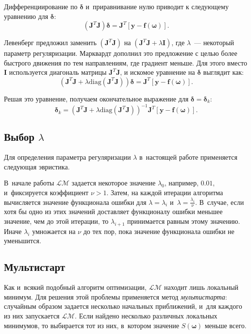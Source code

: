 \documentclass[12pt,a4paper]{amsart}
\begin{document}
Дифференциирование по $\boldsymbol{\delta}$ и~приравнивание нулю приводит к
следующему уравнению для $\boldsymbol{\delta}$:
\[
(\mathbf{J}^T\mathbf{J})\boldsymbol{\delta} = \mathbf{J}^T [\mathbf{y - f(\boldsymbol{\omega})}].
\]

Левенберг предложил заменить $(\mathbf{J}^T\mathbf{J})$ на
$(\mathbf{J}^T\mathbf{J} + \lambda\mathbf{I})$, где $\lambda$~--- некоторый
параметр регуляризации. Марквардт дополнил это предложение с целью более
быстрого движения по тем направлениям, где градиент меньше. Для этого вместо
$\mathbf{I}$ используется диагональ матрицы $\mathbf{J}^T\mathbf{J}$, и
искомое уравнение на $\boldsymbol{\delta}$ выглядит как:
\[
(\mathbf{J}^T\mathbf{J} + \lambda \text{diag} (\mathbf{J}^T\mathbf{J}))\boldsymbol{\delta} = \mathbf{J}^T [\mathbf{y - f(\boldsymbol{\omega})}].
\]

Решая это уравнение, получаем окончательное выражение для
$\boldsymbol{\delta} = \boldsymbol{\delta}_k$:
\[
\boldsymbol{\delta}_k = (\mathbf{J}^T\mathbf{J} + \lambda \text{diag} (\mathbf{J}^T\mathbf{J}))^{-1} \mathbf{J}^T [\mathbf{y - f(\boldsymbol{\omega})}].
\]

\subsection{Выбор $\lambda$}

Для определения параметра регуляризации $\lambda$ в~настоящей работе
применяется следующая эвристика.

В~начале работы $\mathcal{LM}$ задается некоторое значение $\lambda_0$,
например, $0.01$, и~фиксируется коэффициент $\nu > 1$. Затем, на каждой
итерации алгоритма вычисляется значение функционала ошибки для
$\lambda = \lambda_i$ и~$\lambda = \frac{\lambda_i}{\nu}$. В~случае,
если хотя бы одно из этих значений доставляет функционалу ошибки
меньшее значение, чем до этой итерации, то $\lambda_{i+1}$ принимается
равным этому значению. Иначе $\lambda_i$ умножается на $\nu$ до тех
пор, пока значение функционала ошибки не уменьшится.

\subsection{Мультистарт}

Как и~всякий подобный алгоритм оптимизации, $\mathcal{LM}$ находит лишь
локальный минимум. Для решения этой проблемы применяется метод \emph{мультистарта}:
случайным образом задается несколько начальных приближений, и~для каждого из
них запускается $\mathcal{LM}$. Если найдено несколько различных локальных
минимумов, то выбирается тот из них, в~котором значение $S(\boldsymbol{\omega})$
меньше всего.
\end{document}
